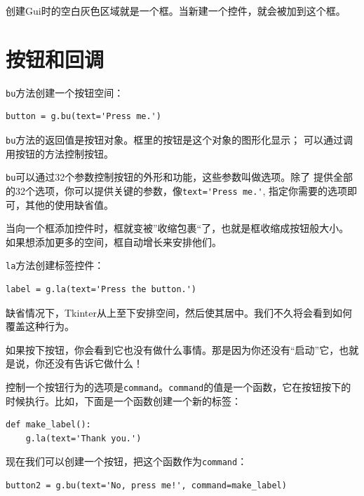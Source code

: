 创建Gui时的空白灰色区域就是一个框。当新建一个控件，就会被加到这个框。

\section{按钮和回调}


{\tt bu}方法创建一个按钮空间：

\beforeverb
\begin{verbatim}
button = g.bu(text='Press me.')
\end{verbatim}
\afterverb

{\tt bu}方法的返回值是按钮对象。框里的按钮是这个对象的图形化显示；
可以通过调用按钮的方法控制按钮。


{\tt bu}可以通过32个参数控制按钮的外形和功能，这些参数叫做选项。除了
提供全部的32个选项，你可以提供关键的参数，像\verb"text='Press me.'",
指定你需要的选项即可，其他的使用缺省值。


当向一个框添加控件时，框就变被”收缩包裹“了，也就是框收缩成按钮般大小。
如果想添加更多的空间，框自动增长来安排他们。


{\tt la}方法创建标签控件：

\beforeverb
\begin{verbatim}
label = g.la(text='Press the button.')
\end{verbatim}
\afterverb

缺省情况下，Tkinter从上至下安排空间，然后使其居中。我们不久将会看到如何覆盖这种行为。

如果按下按钮，你会看到它也没有做什么事情。那是因为你还没有“启动”它，也就是说，你还没有告诉它做什么！

控制一个按钮行为的选项是{\tt command}。{\tt command}的值是一个函数，它在按钮按下的时候执行。比如，下面是一个函数创建一个新的标签：

\beforeverb
\begin{verbatim}
def make_label():
    g.la(text='Thank you.')
\end{verbatim}
\afterverb

现在我们可以创建一个按钮，把这个函数作为{\tt command}：

\beforeverb
\begin{verbatim}
button2 = g.bu(text='No, press me!', command=make_label)
\end{verbatim}
\afterverb

